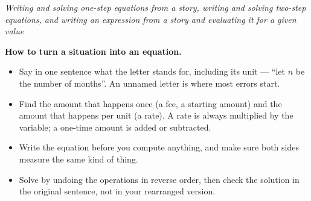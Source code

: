 \documentclass[12pt]{article}
\begin{document}

\begin{center}
\textit{Writing and solving one-step equations from a story, writing and
solving two-step equations, and writing an expression from a story and
evaluating it for a given value}
\end{center}

\noindent\textbf{How to turn a situation into an equation.}
\begin{itemize}[leftmargin=1.2cm, itemsep=2pt, topsep=2pt]
\item Say in one sentence what the letter stands for, including its unit ---
``let $n$ be the number of months''. An unnamed letter is where most errors
start.
\item Find the amount that happens once (a fee, a starting amount) and the
amount that happens per unit (a rate). A rate is always multiplied by the
variable; a one-time amount is added or subtracted.
\item Write the equation before you compute anything, and make sure both sides
measure the same kind of thing.
\item Solve by undoing the operations in reverse order, then check the solution
in the original sentence, not in your rearranged version.
\end{itemize}

\vspace{0.2cm}



\end{document}
